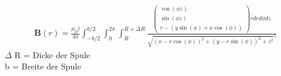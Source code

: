 \documentclass[12pt,a4paper]{article}
\begin{document}
\begin{align*}
\textbf{B}(r) = \frac{\mu_0j}{4\pi}\int_{-b/2}^{b/2}\int_{0}^{2\pi}\int_{R}^{R+\Delta R} \frac{\begin{pmatrix}
\cos(\phi z) \\
\sin(\phi z) \\
r-(y\sin(\phi)+x\cos(\phi))
\end{pmatrix}r dr d\phi dz}{\sqrt{(x-r\cos(\phi))^2+(y-r\sin(\phi))^2+z^2}^3}
\end{align*}
$\Delta$ R = Dicke der Spule \\
b = Breite der Spule
\end{document}
